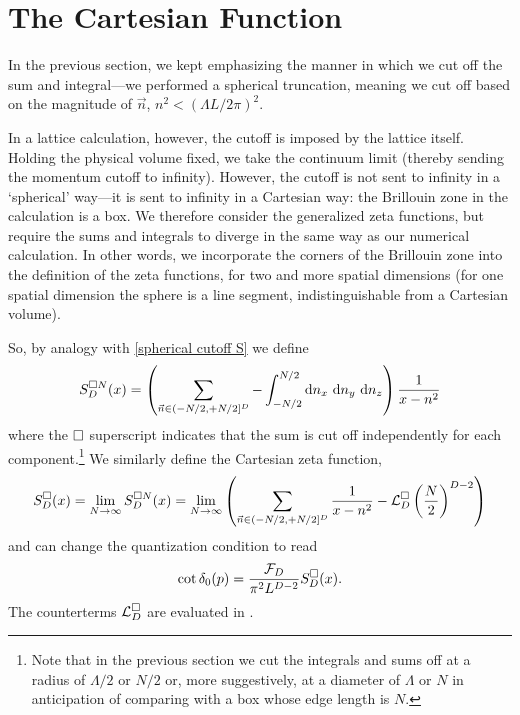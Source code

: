 \section{The Cartesian Function}\label{sec:cartesian}

In the previous section, we kept emphasizing the manner in which we cut off the sum and integral---we performed a spherical truncation, meaning we cut off based on the magnitude of $\vec{n}$, $n^2 < (\Lambda L/2\pi)^2$.

In a lattice calculation, however, the cutoff is imposed by the lattice itself.
Holding the physical volume fixed, we take the continuum limit (thereby sending the momentum cutoff to infinity).
However, the cutoff is not sent to infinity in a `spherical' way---it is sent to infinity in a Cartesian way: the Brillouin zone in the calculation is a box.
We therefore consider the generalized zeta functions, but require the sums and integrals to diverge in the same way as our numerical calculation.
In other words, we incorporate the corners of the Brillouin zone into the definition of the zeta functions, for two and more spatial dimensions (for one spatial dimension the sphere is a line segment, indistinguishable from a Cartesian volume).

So, by analogy with \eqref{spherical cutoff S} we define
\begin{equation}
        S^{\cartesian N}_D(x)
        = \left(
            \sum_{\vec{n} \in (-N/2, +N/2]^D}
            -
            \int_{-N/2}^{N/2} \mathrm{d}n_x\ \mathrm{d}n_y\ \mathrm{d}n_z
        \right) \frac{1}{x-n^2}
\end{equation}
where the $\square$ superscript indicates that the sum is cut off independently for each component.\footnote{Note that in the previous section we cut the integrals and sums off at a radius of $\Lambda/2$ or $N/2$ or, more suggestively, at a diameter of $\Lambda$ or $N$ in anticipation of comparing with a box whose edge length is $N$.}
We similarly define the Cartesian zeta function,
\begin{equation}\label{eq:S cartesian}
    S^{\square}_D(x)
    =
    \lim_{N\rightarrow\infty} S^{\square N}_D(x)
    =
    \lim_{N\rightarrow\infty}\left( \sum_{\vec{n} \in (-N/2, +N/2]^D} \frac{1}{x-n^2} - \mathcal{L}_D^\square \left(\frac{N}{2}\right)^{D-2}\right)
\end{equation}
and can change the quantization condition to read
\begin{equation}\label{eq:cartesian quantization}
    \cot \delta_0(p) = \frac{\mathcal{F}_D}{\pi^2 L^{D-2}} S^\square_D(x).
\end{equation}
The counterterms $\mathcal{L}_D^\square$ are evaluated in .

